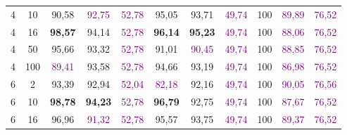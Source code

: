 \begin{table}[ht]
\begin{tabular}{cc|ccc|ccc|ccc}
        {4}                           & {10}    & {90,58}                             & \textcolor{purple}{92,75}           & \textcolor{purple}{52,78}                & {95,05}                         & {93,71}                         & \textcolor{purple}{49,74}      & {100}                           & \textcolor{purple}{89,89}       & \textcolor{purple}{76,52}      \\
        {4}                           & {16}    & \textbf{98,57}                      & {94,14}                             & \textcolor{purple}{52,78}                & \textbf{96,14}                  & \textbf{95,23}                  & \textcolor{purple}{49,74}      & {100}                           & \textcolor{purple}{88,06}       & \textcolor{purple}{76,52}      \\
        {4}                           & {50}    & {95,66}                             & {93,32}                             & \textcolor{purple}{52,78}                & {91,01}                         & \textcolor{purple}{90,45}       & \textcolor{purple}{49,74}      & {100}                           & \textcolor{purple}{88,85}       & \textcolor{purple}{76,52}      \\
        {4}                           & {100}   & \textcolor{purple}{89,41}           & {93,58}                             & \textcolor{purple}{52,78}                & {94,66}                         & {93,19}                         & \textcolor{purple}{49,74}      & {100}                           & \textcolor{purple}{86,98}       & \textcolor{purple}{76,52}      \\
        {6}                           & {2}     & {93,39}                             & {92,94}                             & \textcolor{purple}{52,04}                & \textcolor{purple}{82,18}       & {92,16}                         & \textcolor{purple}{49,74}      & {100}                           & \textcolor{purple}{90,05}       & \textcolor{purple}{76,56}      \\
        {6}                           & {10}    & \textbf{98,78}                      & \textbf{94,23}                      & \textcolor{purple}{52,78}                & \textbf{96,79}                  & {92,75}                         & \textcolor{purple}{49,74}      & {100}                           & \textcolor{purple}{87,67}       & \textcolor{purple}{76,52}      \\
        {6}                           & {16}    & {96,96}                             & \textcolor{purple}{91,32}           & \textcolor{purple}{52,78}                & {95,57}                         & {93,75}                         & \textcolor{purple}{49,74}      & {100}                           & \textcolor{purple}{89,37}       & \textcolor{purple}{76,52}      \\

\end{tabular}
\end{table}
